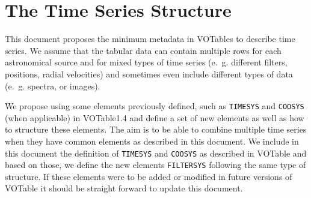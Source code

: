 \documentclass[11pt,a4paper]{ivoa}
\let\fg=\color
\def\elem#1{{\tt{\fg{DarkRed}#1}}}
\begin{document}

\section{The Time Series Structure}
\label{elem:TIMESERIES}
This document proposes the minimum metadata in VOTables to describe time series. We assume that the tabular data can contain multiple rows for each astronomical source and for mixed types of time series (e.~g. different filters, positions, radial velocities) and sometimes even include different types of data (e.~g. spectra, or images). 

We propose using some elements previously defined, such as \elem{TIMESYS} and \elem{COOSYS} (when applicable) in VOTable1.4 \cite{VOTable1.4} and define a set of new elements as well as how to structure these elements. The aim is to be able to combine multiple time series when they have common elements as described in this document. We include in this document the definition of \elem{TIMESYS} and \elem{COOSYS} as described in VOTable and based on those, we define the new elements \elem{FILTERSYS} following the same type of structure. If these elements were to be added or modified in future versions of VOTable it should be straight forward to update this document. 
\end{document}
